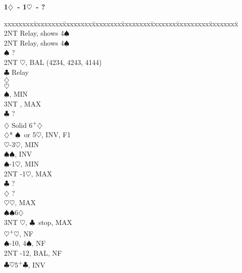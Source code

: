 \documentclass[10pt]{article}
\renewcommand{\c}{$\clubsuit$}
\renewcommand{\d}{$\diamondsuit$}
\newcommand{\h}{$\heartsuit$}
\newcommand{\s}{$\spadesuit$}
\newcommand{\p}{\textsuperscript{+}}
\newenvironment{bidtable}[1][]
{\textbf{#1}
  \begin{adjustwidth}{1em}{}
    \addvspace{2pt}
    \begin{tabbing}
      xxxxxxxx\=xxxxxxxx\=xxxxxxxx\=xxxxxxxx\=xxxxxxxx\=xxxxxxx\=xxxxxxxxx\=xxxxxxxx\=\kill}
{\end{tabbing}\end{adjustwidth}\bigskip}%
\begin{document}
\begin{bidtable}[1\d\ - 1\h\ - ?]
     \>      \>     \> 2NT  \> Relay, shows 4\s                 \\
     \>      \>     \> 2NT  \> Relay, shows 4\s                 \\
     \>      \s \> ?                                        \\
     \>      \> 2NT \h, BAL (4234, 4243, 4144)              \\
     \>      \>     \c  \> Relay                            \\
     \>      \>     \>      \d   {}                    \\
     \>      \>     \>      \h   {}                    \\
     \>      \>     \>      \s   {}, MIN               \\
     \>      \>     \>      \> 3NT   , MAX               \\
     \>      \c \> ?                                        \\
     \>      \d \> Solid 6\p\d                              \\
     \d* {}\s\ or 5\h, INV, F1                             \\
     \>      \h {}-3\h, MIN                               \\
     \>      \>     \s  {}\s, INV                         \\
     \>      \s {}-1\h, MIN                               \\
     \>      \> 2NT -1\h, MAX                               \\
     \>      \c \> ?                                        \\
     \>      \d \> ?                                        \\
     \>      \h {}\h, MAX                                 \\
     \>      \s {}\s 6\d                                        \\
     \>      \> 3NT \h, \c\ stop, MAX                        \\
     \h  {}\p\h, NF                                       \\
     \s  {}-10, 4\s, NF                                   \\
     \> 2NT  -12, BAL, NF                                  \\
     \c  {}\h 5\p\c, INV                                  \\

\end{bidtable}
\end{document}
